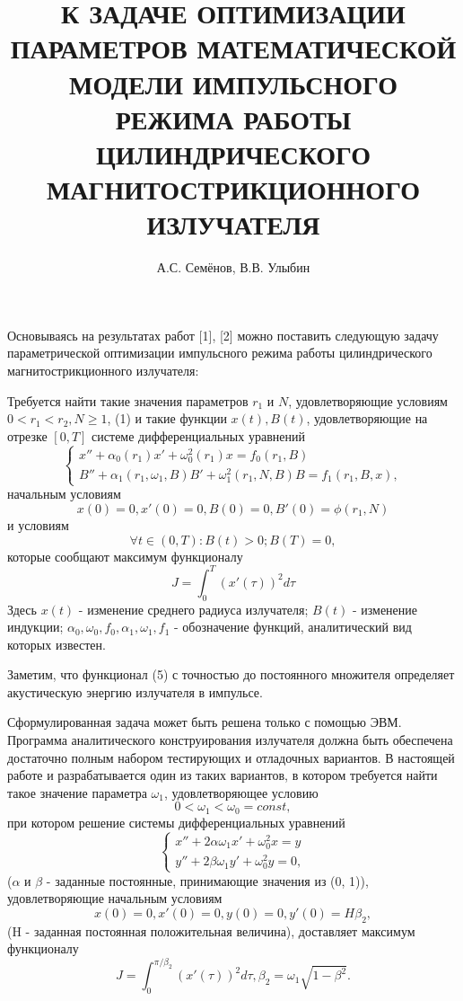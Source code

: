 \documentclass[a4paper, 12pt]{article}
\begin{document}
\title{К ЗАДАЧЕ ОПТИМИЗАЦИИ ПАРАМЕТРОВ МАТЕМАТИЧЕСКОЙ МОДЕЛИ ИМПУЛЬСНОГО РЕЖИМА РАБОТЫ ЦИЛИНДРИЧЕСКОГО МАГНИТОСТРИКЦИОННОГО ИЗЛУЧАТЕЛЯ}
\author{А.С. Семёнов, В.В. Улыбин}
\date{}
\maketitle

Основываясь на результатах работ [1], [2] можно поставить следующую задачу параметрической оптимизации импульсного режима работы цилиндрического магнитострикционного излучателя:

Требуется найти такие значения параметров $r_1$ и $N$, удовлетворяющие условиям  $0 < r_1 < r_2, N \geqslant 1$, (1) и такие функции $x(t), B(t)$, удовлетворяющие на отрезке $[0, T]$ системе дифференциальных уравнений
\[
\begin{cases}
x'' + \alpha_0(r_1)x' + \omega^2_0(r_1)x = f_0(r_1, B)\\
B'' + \alpha_1(r_1, \omega_1, B)B' + \omega^2_1(r_1, N, B)B = f_1(r_1, B, x),
\end{cases}
\]
начальным условиям
\[
x(0)=0, x'(0)=0, B(0)=0, B'(0)=\phi(r_1, N)
\]
и условиям
\[
\forall t \in (0, T): B(t)>0; B(T)=0,
\]
которые сообщают максимум функционалу
\[
J=\int_{0}^{T}(x'(\tau))^2d\tau
\]
Здесь $x(t)$ - изменение среднего радиуса излучателя; $B(t)$ - изменение индукции; $\alpha_0,\omega_0,f_0,\alpha_1,\omega_1,f_1$ - обозначение функций, аналитический вид которых известен.

Заметим, что функционал (5) с точностью до постоянного множителя определяет акустическую энергию излучателя в импульсе.

Сформулированная задача может быть решена только с помощью ЭВМ. Программа аналитического конструирования излучателя должна быть обеспечена достаточно полным набором тестирующих и отладочных вариантов. В настоящей работе и разрабатывается один из таких вариантов, в котором требуется найти такое значение параметра $\omega_1$, удовлетворяющее условию
\[
0 < \omega_1 < \omega_0 = const,
\]
при котором решение  системы дифференциальных уравнений
\[
\begin{cases}
x'' + 2\alpha\omega_1x' + \omega^2_0x = y\\
y'' + 2\beta\omega_1y' + \omega^2_0y = 0,
\end{cases}
\]
($\alpha$ и $\beta$ - заданные постоянные, принимающие значения из (0, 1)), удовлетворяющие начальным условиям
\[
x(0)=0, x'(0)=0, y(0)=0, y'(0)=H\beta_2,
\]
(H - заданная постоянная положительная величина), доставляет максимум функционалу
\[
J=\int_{0}^{\pi/\beta_2}(x'(\tau))^2d\tau, \beta_2=\omega_1\sqrt{1-\beta^2}.
\]
\end{document}
